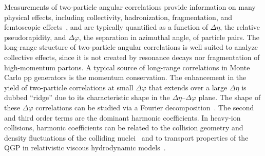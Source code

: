 Measurements of two-particle angular correlations provide information on many physical effects, including collectivity, hadronization, fragmentation, and femtoscopic effects~\cite{Lisa:2005dd}, and are typically quantified as a function of $\Delta\eta$, the relative pseudorapidity, and $\Delta\varphi$, the separation in azimuthal angle, of particle pairs. The long-range structure of two-particle angular correlations is well suited to analyze collective effects, since it is not created by resonance decays nor fragmentation of high-momentum partons. A typical source of long-range correlations in Monte Carlo pp generators is the momentum conservation. %
The enhancement in the yield of two-particle correlations at small $\Delta\varphi$ that extends over a large $\Delta\eta$ is dubbed ``ridge'' due to its characteristic shape in the $\Delta\eta$--$\Delta\varphi$ plane.
The shape of these $\Delta\varphi$ correlations can be studied via a Fourier decomposition~\cite{Poskanzer:1998yz,Voloshin:2008dg}. The second and third order terms are the dominant harmonic coefficients. In heavy-ion collisions, harmonic coefficients can be related to the collision geometry and density fluctuations of the colliding nuclei~\cite{Alver:2010gr,Alver:2010dn,ALICE:2011ab} and to transport properties of the QGP in relativistic viscous hydrodynamic models~\cite{Gale:2012rq,Niemi:2015qia,Shen:2014vra,Bernhard:2016tnd,Bernhard:2019bmu}.

